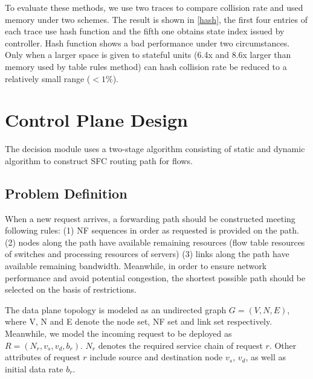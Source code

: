 \documentclass[10pt, conference, letterpaper]{IEEEtran}
\begin{document}
To evaluate these methods, we use two traces to compare collision rate and used memory under two schemes. The result is shown in \ref{hash}, the first four entries of each trace use hash function and the fifth one obtains state index issued by controller. 
Hash function shows a bad performance under two circumstances. Only when a larger space is given to stateful units (6.4x and 8.6x larger than memory used by table rules method) can hash collision rate be reduced to a relatively small range ($<1\%$).



\section{Control Plane Design}
The decision module uses a two-stage algorithm consisting of static and dynamic algorithm to construct SFC routing path for flows. 



\subsection{Problem Definition}
When a new request arrives, a forwarding path should be constructed meeting following rules: (1) NF sequences in order as requested is provided on the path. (2) nodes along the path have available remaining resources (flow table resources of switches and processing resources of servers) (3) links along the path have available remaining bandwidth. Meanwhile, in order to ensure network performance and avoid potential congestion, the shortest possible path should be selected on the basis of restrictions.


The data plane topology is modeled as an undirected graph $G=(V, N, E)$, where V, N and E denote the node set, NF set and link set respectively. Meanwhile, we model the incoming request to be deployed as $R=(N_r, v_{s}, v_{d}, b_r)$. $N_r$ denotes the required service chain of request $r$. Other attributes of request $r$ include source and destination node $v_{s}$, $v_{d}$, as well as initial data rate $b_r$. 
\end{document}
